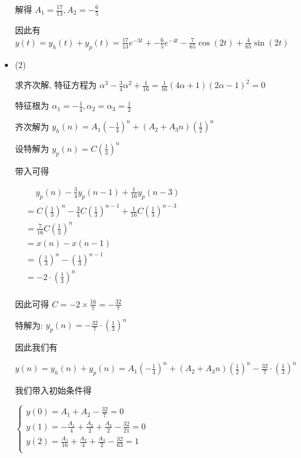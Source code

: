 \documentclass[a4paper,UTF8]{article}
\numberwithin{equation}{section}
\begin{document}
\begin{framed}
\begin{spacing}{1.5}
\begin{itemize}
      解得 $\displaystyle A_{1} = \frac{17}{13}, A_{2} = - \frac{6}{5}$
      
      因此有 $\displaystyle y(t) = y_h(t) + y_p(t) = \frac{17}{13} e^{-3t} + - \frac{6}{5} e^{-4t} - \frac{7}{65}\cos(2t) + \frac{4}{65}\sin(2t)$
      
      \item (2)
      
      求齐次解, 特征方程为 $\displaystyle \alpha^{3}-\frac{3}{4}\alpha^{2}+\frac{1}{16} = \frac{1}{16}(4 \alpha + 1)(2 \alpha - 1)^{2} = 0$
      
      特征根为 $\displaystyle \alpha_1 = -\frac{1}{4}, \alpha_2 = \alpha_3 = \frac{1}{2}$
      
      齐次解为 $\displaystyle y_h(n) = A_1 (-\frac{1}{4})^{n} + (A_2 + A_3n)(\frac{1}{2})^{n}$
      
      设特解为 $\displaystyle y_p(n) = C(\frac{1}{3})^{n}$
      
      带入可得
      
      $
      \begin{aligned}
      &\quad\ y_p(n) - \frac{3}{4}y_p(n-1) + \frac{1}{16}y_p(n-3) \\
      &= C(\frac{1}{3})^{n} - \frac{3}{4}C(\frac{1}{3})^{n-1} + \frac{1}{16}C(\frac{1}{3})^{n-3} \\
      &= \frac{7}{16}C(\frac{1}{3})^{n} \\
      &= x(n) - x(n-1) \\
      &= (\frac{1}{3})^{n} - (\frac{1}{3})^{n-1} \\
      &= - 2 \cdot (\frac{1}{3})^{n} \\
      \end{aligned}
      $
      
      因此可得 $\displaystyle C = -2 \times \frac{16}{7} = - \frac{32}{7}$
      
      特解为: $\displaystyle y_p(n) = - \frac{32}{7}\cdot (\frac{1}{3})^{n}$
      
      因此我们有
      
      $\displaystyle y(n) = y_h(n) + y_p(n) = A_1 (-\frac{1}{4})^{n} + (A_2 + A_3n)(\frac{1}{2})^{n} - \frac{32}{7}\cdot (\frac{1}{3})^{n}$
      
      我们带入初始条件得
      
      $
      \begin{cases}
          \displaystyle y(0) = A_{1} + A_{2} - \frac{32}{7} = 0 \\
          \displaystyle y(1) = - \frac{A_{1}}{4} + \frac{A_{2}}{2} + \frac{A_{3}}{2} - \frac{32}{21} = 0 \\
          \displaystyle y(2) = \frac{A_{1}}{16} + \frac{A_{2}}{4} + \frac{A_{3}}{2} - \frac{32}{63} = 1 \\
      \end{cases}
      $
      

\end{itemize}
\end{spacing}
\end{framed}
\end{document}
